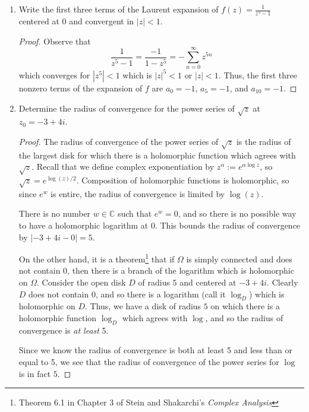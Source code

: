 \documentclass{article}
\begin{document}
\begin{enumerate}
\begin{proof}
	\end{proof}
	
	\newpage
	
	\item Write the first three terms of the Laurent expansion of $\displaystyle f(z) = \frac{1}{z^5-1}$ centered at $0$ and convergent in $|z|<1$.
	
	\begin{proof}
		Observe that \[\frac{1}{z^5-1} = \frac{-1}{1-z^5} = -\sum_{n=0}^\infty z^{5n}\]
		which converges for $|z^5|<1$ which is $|z|^5<1$ or $|z|<1$. 
		Thus, the first three nonzero terms of the expansion of $f$ are 
		$a_0 = -1$, $a_5=-1$, and $a_{10} = -1$.
	\end{proof}
	
	\setcounter{enumi}{4}
	
	\item Determine the radius of convergence for the power series of $\sqrt{z}$ at $z_0 = -3 + 4i$.
	
	\begin{proof}
	The radius of convergence of the power series of $\sqrt{z}$ is the radius of the largest disk for which there is a holomorphic function which agrees with $\sqrt{z}$.
	Recall that we define complex exponentiation by $z^\alpha := e^{\alpha \log z}$, so $\sqrt{z} = e^{\log(z)/2}$. Composition of holomorphic functions is holomorphic, so since $e^w$ is entire, the radius of convergence is limited by $\log(z)$. 
	
	There is no number $w \in \mathbb{C}$ such that $e^w = 0$, and so there is no possible way to have a holomorphic logarithm at $0$. This bounds the radius of convergence by $|-3 + 4i - 0|=5$. 
	
	On the other hand, it is a theorem\footnote{Theorem 6.1 in Chapter 3 of Stein and Shakarchi's \textit{Complex Analysis}} that if $\Omega$ is simply connected and does not contain $0$, then there is a branch of the logarithm which is holomorphic on $\Omega$. Consider the open disk $D$ of radius $5$ and centered at $-3 + 4i$. Clearly $D$ does not contain $0$, and so there is a logarithm (call it $\log_D$) which is holomorphic on $D$. Thus, we have a disk of radius $5$ on which there is a holomorphic function $\log_D$ which agrees with $\log$, and so the radius of convergence is \textit{at least} 5. 
	
	Since we know the radius of convergence is both at least 5 and less than or equal to 5, we see that the radius of convergence of the power series for $\log$ is in fact $5$.
	

\end{proof}
\end{enumerate}
\end{document}
